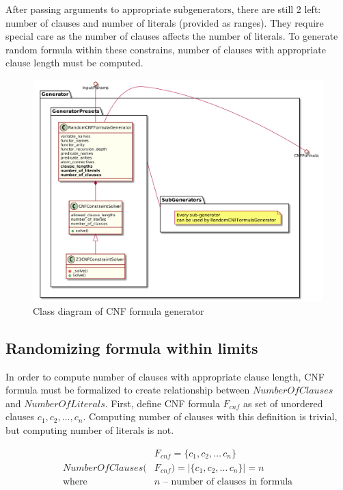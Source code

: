 After passing arguments to appropriate subgenerators, there are still 2 left: number of clauses and number of literals (provided as ranges). They require special care as the number of clauses affects the number of literals. To generate random formula within these constrains, number of clauses with appropriate clause length must be computed.

\begin{figure}[h]
\begin{centering}
  \includegraphics[width=\textwidth]{logic-formula-generator/cnf_formula_generator.png}
  \caption{Class diagram of CNF formula generator}
  \label{pic:cnf_generator_class_diagram}
\end{centering}
\end{figure}

\subsection{Randomizing formula within limits}
\label{sec:RandomizeFormula}

In order to compute number of clauses with appropriate clause length, CNF formula must be formalized to create relationship between $NumberOfClauses$ and $NumberOfLiterals$.
First, define CNF formula $F_{cnf}$ as set of unordered clauses $c_1, c_2, \dots, c_n$. Computing number of clauses with this definition is trivial, but computing number of literals is not.

\begin{align*}
	&F_{cnf} = \{c_1, c_2, \dots\, c_n\}  \\
  NumberOfClauses(&F_{cnf}) = |\{c_1, c_2, \dots\, c_n\}| = n \\
	\text{where }
		&n \text{ -- number of clauses in formula}
\end{align*}

